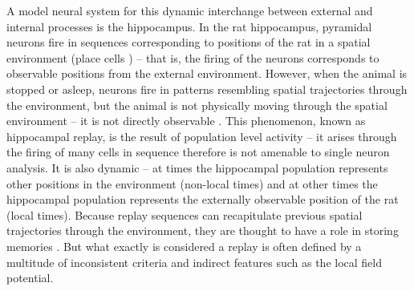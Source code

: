 \documentclass[11pt]{article}
\begin{document}
A model neural system for this dynamic interchange between external and internal processes is the hippocampus. In the rat hippocampus, pyramidal neurons fire in sequences corresponding to positions of the rat in a spatial environment (place cells \cite{OKeefehippocampusspatialmap1971,OKeefehippocampuscognitivemap1978}) – that is, the firing of the neurons corresponds to observable positions from the external environment. However, when the animal is stopped or asleep, neurons fire in patterns resembling spatial trajectories through the environment, but the animal is not physically moving through the spatial environment – it is not directly observable \cite{FosterReplayComesAge2017}. This phenomenon, known as hippocampal replay, is the result of population level activity – it arises through the firing of many cells in sequence therefore is not amenable to single neuron analysis. It is also dynamic – at times the hippocampal population represents other positions in the environment (non-local times) and at other times the hippocampal population represents the externally observable position of the rat (local times). Because replay sequences can recapitulate previous spatial trajectories through the environment, they are thought to have a role in storing memories \cite{GillespieHippocampalreplayreflects2021}. But what exactly is considered a replay is often defined by a multitude of inconsistent criteria and indirect features such as the local field potential.
\end{document}
